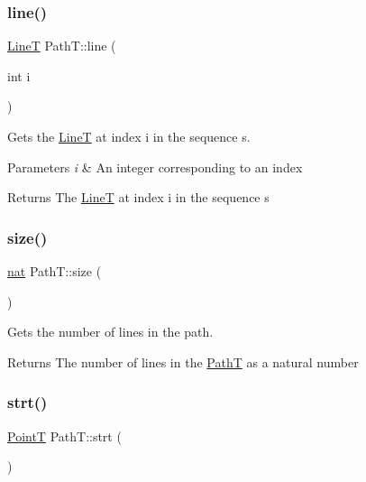 \subsubsection{\texorpdfstring{line()}{line()}}
{\footnotesize\ttfamily \mbox{\hyperlink{class_line_t}{LineT}} Path\+T\+::line (\begin{DoxyParamCaption}\item[{int}]{i }\end{DoxyParamCaption})}



Gets the \mbox{\hyperlink{class_line_t}{LineT}} at index i in the sequence s. 


\begin{DoxyParams}{Parameters}
{\em i} & An integer corresponding to an index \\
\hline
\end{DoxyParams}
\begin{DoxyReturn}{Returns}
The \mbox{\hyperlink{class_line_t}{LineT}} at index i in the sequence s 
\end{DoxyReturn}
\mbox{\label{class_path_t_a6899210e56f6d080949878a1d1b3c361}} 
\subsubsection{\texorpdfstring{size()}{size()}}
{\footnotesize\ttfamily \mbox{\hyperlink{_path_a_d_t_8h_a56638ee9d162e8cce3a15f92d2023d6e}{nat}} Path\+T\+::size (\begin{DoxyParamCaption}{ }\end{DoxyParamCaption})}



Gets the number of lines in the path. 

\begin{DoxyReturn}{Returns}
The number of lines in the \mbox{\hyperlink{class_path_t}{PathT}} as a natural number 
\end{DoxyReturn}
\mbox{\label{class_path_t_a5aab4a4082e4772ff4c52834f3bec7e2}} 
\subsubsection{\texorpdfstring{strt()}{strt()}}
{\footnotesize\ttfamily \mbox{\hyperlink{class_point_t}{PointT}} Path\+T\+::strt (\begin{DoxyParamCaption}{ }\end{DoxyParamCaption})}




